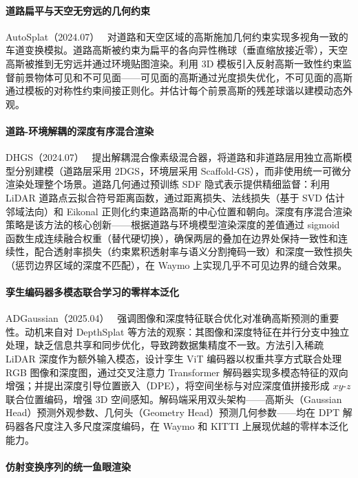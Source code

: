 \paragraph{道路扁平与天空无穷远的几何约束}

AutoSplat（2024.07）~\cite{2407_02598} 对道路和天空区域的高斯施加几何约束实现多视角一致的车道变换模拟。道路高斯被约束为扁平的各向异性椭球（垂直缩放接近零），天空高斯被推到无穷远并通过环境贴图渲染。利用 3D 模板引入反射高斯一致性约束监督前景物体可见和不可见面——可见面的高斯通过光度损失优化，不可见面的高斯通过模板的对称性约束间接正则化。并估计每个前景高斯的残差球谐以建模动态外观。

\paragraph{道路-环境解耦的深度有序混合渲染}

DHGS（2024.07）~\cite{2407_16600} 提出解耦混合像素级混合器，将道路和非道路层用独立高斯模型分别建模（道路层采用 2DGS，环境层采用 Scaffold-GS），而非使用统一可微分渲染处理整个场景。道路几何通过预训练 SDF 隐式表示提供精细监督：利用 LiDAR 道路点云拟合符号距离函数，通过距离损失、法线损失（基于 SVD 估计邻域法向）和 Eikonal 正则化约束道路高斯的中心位置和朝向。深度有序混合渲染策略是该方法的核心创新——根据道路与环境模型渲染深度的差值通过 sigmoid 函数生成连续融合权重（替代硬切换），确保两层的叠加在边界处保持一致性和连续性，配合透射率损失（约束累积透射率与语义分割掩码一致）和深度一致性损失（惩罚边界区域的深度不匹配），在 Waymo 上实现几乎不可见边界的缝合效果。

\paragraph{孪生编码器多模态联合学习的零样本泛化}

ADGaussian（2025.04）~\cite{2504_00437} 强调图像和深度特征联合优化对准确高斯预测的重要性。动机来自对 DepthSplat 等方法的观察：其图像和深度特征在并行分支中独立处理，缺乏信息共享和同步优化，导致跨数据集精度不一致。方法引入稀疏 LiDAR 深度作为额外输入模态，设计孪生 ViT 编码器以权重共享方式联合处理 RGB 图像和深度图，通过交叉注意力 Transformer 解码器实现多模态特征的双向增强；并提出深度引导位置嵌入（DPE），将空间坐标与对应深度值拼接形成 $xy$-$z$ 联合位置编码，增强 3D 空间感知。解码端采用双头架构——高斯头（Gaussian Head）预测外观参数、几何头（Geometry Head）预测几何参数——均在 DPT 解码器各尺度注入多尺度深度编码，在 Waymo 和 KITTI 上展现优越的零样本泛化能力。

\paragraph{仿射变换序列的统一鱼眼渲染}


